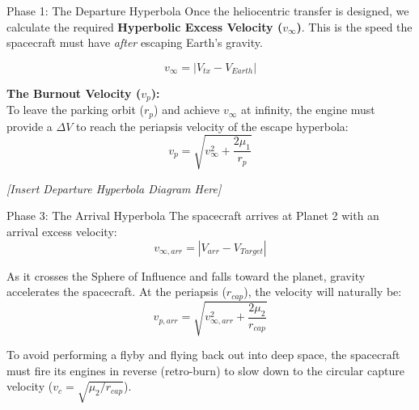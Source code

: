 \documentclass[11pt]{beamer}
\begin{document}
\begin{frame}{Phase 1: The Departure Hyperbola}
    Once the heliocentric transfer is designed, we calculate the required \textbf{Hyperbolic Excess Velocity ($v_\infty$)}. This is the speed the spacecraft must have \textit{after} escaping Earth's gravity.
    
    \begin{equation}
        v_{\infty} = | V_{tx} - V_{Earth} |
    \end{equation}
    
    \textbf{The Burnout Velocity ($v_p$):} \\
    To leave the parking orbit ($r_p$) and achieve $v_\infty$ at infinity, the engine must provide a $\Delta V$ to reach the periapsis velocity of the escape hyperbola:
    \begin{equation}
        v_p = \sqrt{v_\infty^2 + \frac{2\mu_1}{r_p}}
    \end{equation}

    \begin{center}
        \textit{[Insert Departure Hyperbola Diagram Here]}
    \end{center}
\end{frame}

\begin{frame}{Phase 3: The Arrival Hyperbola}
    The spacecraft arrives at Planet 2 with an arrival excess velocity:
    \begin{equation}
        v_{\infty, arr} = | V_{arr} - V_{Target} |
    \end{equation}
    
    As it crosses the Sphere of Influence and falls toward the planet, gravity accelerates the spacecraft. At the periapsis ($r_{cap}$), the velocity will naturally be:
    \begin{equation}
        v_{p, arr} = \sqrt{v_{\infty, arr}^2 + \frac{2\mu_2}{r_{cap}}}
    \end{equation}
    
    To avoid performing a flyby and flying back out into deep space, the spacecraft must fire its engines in reverse (retro-burn) to slow down to the circular capture velocity ($v_c = \sqrt{\mu_2/r_{cap}}$).
\end{frame}
\end{document}
